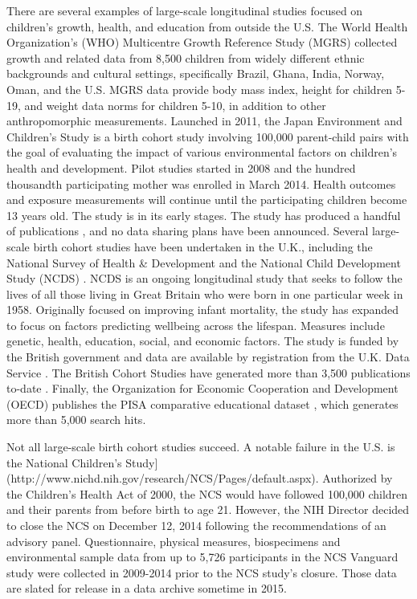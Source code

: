 \documentclass[letterpaper,man,apacite]{apa6}
\begin{document}
There are several examples of large-scale longitudinal studies focused on children's growth, health, and education from outside the U.S.
The World Health Organization's (WHO) Multicentre Growth Reference Study (MGRS) \cite{MGRS} collected growth and related data from 8,500 children from widely different ethnic backgrounds and cultural settings, specifically Brazil, Ghana, India, Norway, Oman, and the U.S.
MGRS data provide body mass index, height for children 5-19, and weight data norms for children 5-10, in addition to other anthropomorphic measurements.
Launched in 2011, the Japan Environment and Children's Study \cite{JECS} is a birth cohort study involving 100,000 parent-child pairs with the goal of evaluating the impact of various environmental factors on children's health and development. 
Pilot studies started in 2008 and the hundred thousandth participating mother was enrolled in March 2014. 
Health outcomes and exposure measurements will continue until the participating children become 13 years old.
The study is in its early stages.
The study has produced a handful of publications \cite{JECS_pubs}, and no data sharing plans have been announced.
Several large-scale birth cohort studies have been undertaken in the U.K., including the National Survey of Health & Development \cite{NSHD_UK} and the National Child Development Study (NCDS) \cite{NCDS_UK}.
NCDS is an ongoing longitudinal study that seeks to follow the lives of all those living in Great Britain who were born in one particular week in 1958.
Originally focused on improving infant mortality, the study has expanded to focus on factors predicting wellbeing across the lifespan.
Measures include genetic, health, education, social, and economic factors.
The study is funded by the British government and data are available by registration from the U.K. Data Service \cite{UK_cohort_data}.
The British Cohort Studies have generated more than 3,500 publications to-date \cite{UK_cohort_citations}.
Finally, the Organization for Economic Cooperation and Development (OECD) publishes the PISA comparative educational dataset \cite{PISA}, which generates more than 5,000 search hits.

Not all large-scale birth cohort studies succeed.
A notable failure in the U.S. is the National Children's Study](http://www.nichd.nih.gov/research/NCS/Pages/default.aspx).
Authorized by the Children's Health Act of 2000, the NCS would have followed 100,000 children and their parents from before birth to age 21. 
However, the NIH Director decided to close the NCS on December 12, 2014 following the recommendations of an advisory panel. 
Questionnaire, physical measures, biospecimens and environmental sample data from up to 5,726 participants in the NCS Vanguard study were collected in 2009-2014 prior to the NCS study's closure.
Those data are slated for release in a data archive sometime in 2015.
\end{document}

